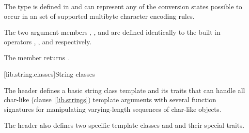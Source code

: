 \pnum
The type
is defined in
and can represent any of the conversion states possible to occur in an  set of supported multibyte character encoding rules.

\pnum
The two-argument members
,
,
and
are defined identically to the built-in operators
\tcode{=},
\tcode{==},
and
\tcode{<}
respectively.

\pnum
The member
returns
.

[lib.string.classes]{String classes}

\pnum
The header  defines a basic string
class template and its traits that can handle all char-like
(clause~\ref{lib.strings}) template arguments with several function
signatures for manipulating varying-length sequences of char-like objects.

\pnum
The header  also defines two specific template
classes  and  and their special traits.


